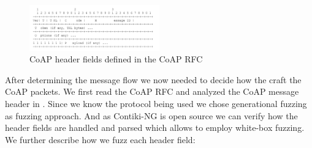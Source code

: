 \begin{figure}[h]
		\centering		
		\includegraphics[width=0.5\textwidth]{images/coap_message_format.pdf}
		\caption{CoAP header fields defined in the CoAP RFC~\cite{RFC7252}}
		\label{figure:coap_header}
\end{figure}

After determining the message flow we now needed to decide how the craft the CoAP packets. We first read the CoAP RFC and analyzed the CoAP message header in . Since we know the protocol being used we chose generational fuzzing as fuzzing approach. And as Contiki-NG is open source we can verify how the header fields are handled and parsed which allows to employ white-box fuzzing. We further describe how we fuzz each header field:

